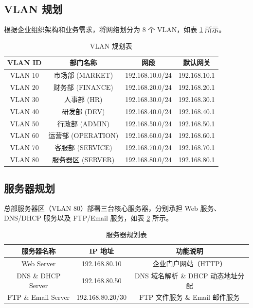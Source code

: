 \documentclass[12pt,a4paper]{ctexart}
\begin{document}
\subsection{VLAN 规划}

根据企业组织架构和业务需求，将网络划分为 8 个 VLAN，如表 \ref{tab:vlan} 所示。

\begin{table}[H]
\centering
\caption{VLAN 规划表}
\label{tab:vlan}
\begin{tabular}{|c|c|c|c|}
\hline
\textbf{VLAN ID} & \textbf{部门名称} & \textbf{网段}           & \textbf{默认网关}   \\ \hline
VLAN 10          & 市场部 (MARKET)   & 192.168.10.0/24         & 192.168.10.1        \\ \hline
VLAN 20          & 财务部 (FINANCE)  & 192.168.20.0/24         & 192.168.20.1        \\ \hline
VLAN 30          & 人事部 (HR)       & 192.168.30.0/24         & 192.168.30.1        \\ \hline
VLAN 40          & 研发部 (DEV)      & 192.168.40.0/24         & 192.168.40.1        \\ \hline
VLAN 50          & 行政部 (ADMIN)    & 192.168.50.0/24         & 192.168.50.1        \\ \hline
VLAN 60          & 运营部 (OPERATION)& 192.168.60.0/24         & 192.168.60.1        \\ \hline
VLAN 70          & 客服部 (SERVICE)  & 192.168.70.0/24         & 192.168.70.1        \\ \hline
VLAN 80          & 服务器区 (SERVER) & 192.168.80.0/24         & 192.168.80.1        \\ \hline
\end{tabular}
\end{table}

\subsection{服务器规划}

总部服务器区（VLAN 80）部署三台核心服务器，分别承担 Web 服务、DNS/DHCP 服务以及 FTP/Email 服务，如表 \ref{tab:server} 所示。

\begin{table}[H]
\centering
\caption{服务器规划表}
\label{tab:server}
\begin{tabular}{|c|c|c|}
\hline
\textbf{服务器名称} & \textbf{IP 地址}      & \textbf{功能说明}                  \\ \hline
Web Server          & 192.168.80.10         & 企业门户网站（HTTP）               \\ \hline
DNS \& DHCP Server  & 192.168.80.50         & DNS 域名解析 \& DHCP 动态地址分配   \\ \hline
FTP \& Email Server & 192.168.80.20/30      & FTP 文件服务 \& Email 邮件服务      \\ \hline
\end{tabular}
\end{table}
\end{document}
